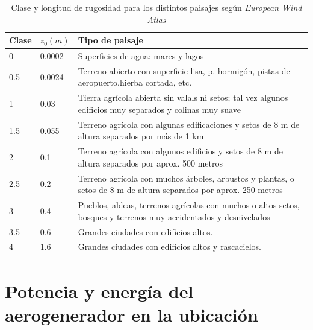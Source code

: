 \documentclass[12pt]{report}
\begin{document}
\begin{table}[H]
    \centering
    \begin{tabular}{l l p{13cm}}
        \hline
        Clase & $z_0(m)$ & Tipo de paisaje \\
        \hline
        0 & 0.0002 & Superficies de agua: mares y lagos \\
        0.5 & 0.0024 & Terreno abierto con superficie lisa, p. hormigón, pistas de aeropuerto,hierba cortada, etc. \\
        1 & 0.03 & Tierra agrícola abierta sin valals ni setos; tal vez algunos edificios muy separados y colinas muy suave \\
        1.5 & 0.055 & Terreno agrícola con algunas edificaciones y setos de 8 m de altura separados por más de 1 km \\
        2 & 0.1 & Terreno agrícola con algunos edificios y setos de 8 m de altura separados por aprox. 500 metros \\
        2.5 & 0.2 & Terreno agrícola con muchos árboles, arbustos y plantas, o setos de 8 m de altura separados por aprox. 250 metros \\
        3 & 0.4 & Pueblos, aldeas, terrenos agrícolas con muchos o altos setos, bosques y terrenos muy accidentados y desnivelados \\
        3.5 & 0.6 & Grandes ciudades con edificios altos. \\
        4 & 1.6 & Grandes ciudades con edificios altos y rascacielos. \\ 
        \hline
    \end{tabular}
    
    \caption{Clase y longitud de rugosidad para los distintos paisajes según \textit{European Wind Atlas}}
    \label{Tabla: Clase y longitud de rugosidad.}
\end{table}

\section{Potencia y energía del aerogenerador en la ubicación}


\end{document}
